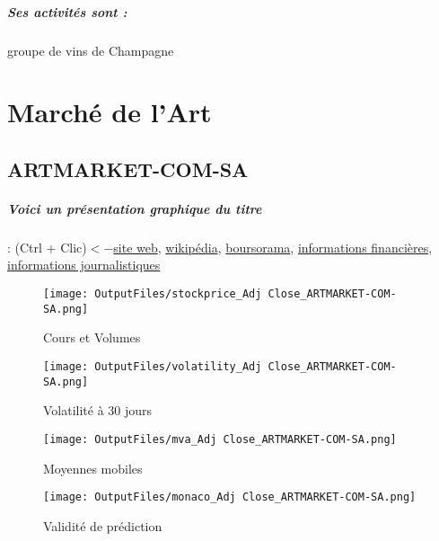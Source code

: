 \documentclass[11pt,a4paper]{report}%
\begin{document}
\paragraph{Ses activités sont : } groupe de vins de Champagne 
    
    \newpage\chapter{Marché de l’Art}


\section{ARTMARKET-COM-SA}

\paragraph{Voici un présentation graphique du titre} : (Ctrl + Clic)$<-$\href{https://www.artmarket.com/}{site web}, \href{https://fr.wikipedia.org/wiki/ArtMarket.com}{wikipédia}, \href{https://www.boursorama.com/cours/1rPPRC}{boursorama}, \href{https://www.qwant.com/?q=site:https:%2f%2fwww.easybourse.com%2faction-societe%2fARTMARKET-COM-SA&t=web&client=ext-firefox-hp}{informations financières}, \href{https://bourse.lerevenu.com/cours-de-bourse/fiche-valeur-synthese/ARTMARKET-COM-SA/PRC-FR}{informations journalistiques}
\begin{figure}[!htb]
   \begin{minipage}{0.5\textwidth}
     \centering
     \texttt{[image: OutputFiles/stockprice\_Adj Close\_ARTMARKET-COM-SA.png]}
     \caption{Cours et Volumes}\label{Fig:price_ARTMARKET-COM-SA}
   \end{minipage}\hfill
   \begin{minipage}{0.5\textwidth}
     \centering
     \texttt{[image: OutputFiles/volatility\_Adj Close\_ARTMARKET-COM-SA.png]}
     \caption{Volatilité à 30 jours}\label{Fig:volat_ARTMARKET-COM-SA}
   \end{minipage}
\end{figure}
\begin{figure}[!htb]
   \begin{minipage}{0.5\textwidth}
     \centering
     \texttt{[image: OutputFiles/mva\_Adj Close\_ARTMARKET-COM-SA.png]}
     \caption{Moyennes mobiles}\label{Fig:mva_ARTMARKET-COM-SA}
   \end{minipage}\hfill
   \begin{minipage}{0.5\textwidth}
     \centering
     \texttt{[image: OutputFiles/monaco\_Adj Close\_ARTMARKET-COM-SA.png]}
     \caption{Validité de prédiction}\label{Fig:prediction_ARTMARKET-COM-SA}
   \end{minipage}
\end{figure}
\end{document}
